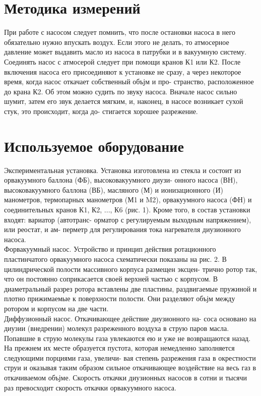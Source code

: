 \documentclass[a4paper,12pt]{article} %
\begin{document}
\section{Методика измерений}

При работе с насосом следует помнить, что после остановки насоса
в него обязательно нужно впускать воздух. Если этого не делать, то
атмосерное давление может выдавить масло из насоса в патрубки и в
вакуумную систему. Соединять насос с атмосерой следует при помощи
кранов К1 или К2.
После включения насоса его присоединяют к установке не сразу, а
через некоторое время, когда насос откачает собственный объјм и про-
странство, расположенное до крана К2. Об этом можно судить по звуку
насоса. Вначале насос сильно шумит, затем его звук делается мягким,
и, наконец, в насосе возникает сухой стук, это происходит, когда до-
стигается хорошее разрежение.

\section{Используемое оборудование}

Экспериментальная установка. Установка изготовлена из стекла и
состоит из орвакуумного баллона (ФБ), высоковакуумного диузи-
онного насоса (ВН), высоковакуумного баллона (ВБ), масляного (М) и
ионизационного (И) манометров, термопарных манометров (М1 и M2),
орвакуумного насоса (ФН) и соединительных кранов К1, К2, ..., К6
(рис. 1). Кроме того, в состав установки входят: вариатор (автотранс-
орматор с регулируемым выходным напряжением), или реостат, и ам-
перметр для регулирования тока нагревателя диузионного насоса. \\

Форвакуумный насос. Устройство и принцип действия ротационного
пластинчатого орвакуумного насоса схематически показаны на рис. 2.
В цилиндрической полости массивного корпуса размещен эксцен-
трично ротор так, что он постоянно соприкасается своей верхней частью
с корпусом. В диаметральный разрез ротора вставлены две пластины,
раздвигаемые пружиной и плотно прижимаемые к поверхности полости.
Они разделяют объјм между ротором и корпусом на две части. \\

Диффузионный насос. Откачивающее действие диузионного на-
соса основано на диузии (внедрении) молекул разреженного воздуха
в струю паров масла. Попавшие в струю молекулы газа увлекаются ею
и уже не возвращаются назад. На прежнем их месте образуется пустота,
которая немедленно заполняется следующими порциями газа, увеличи-
вая степень разрежения газа в окрестности струи и оказывая таким
образом сильное откачивающее воздействие на весь газ в откачиваемом
объјме. Скорость откачки диузионных насосов в сотни и тысячи раз
превосходит скорость откачки орвакуумного насоса.  \\
\end{document}
